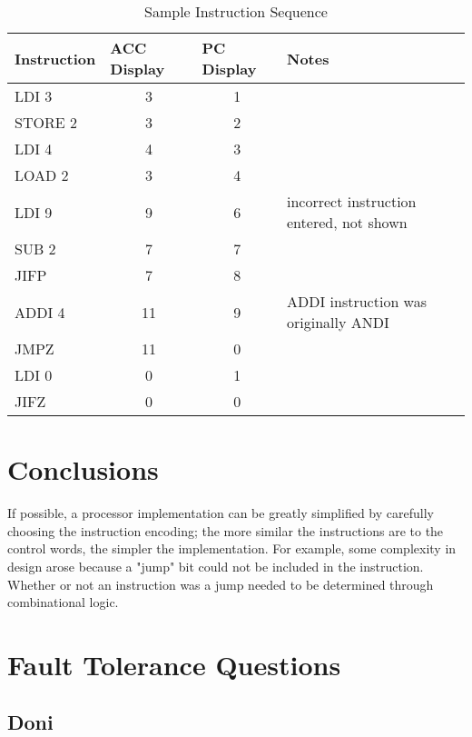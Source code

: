 \documentclass{scrreprt}
\newcommand{\TabLabel}[1]{\label{tab:#1}}
\begin{document}
    \begin{table}[ht]
        \centering
        \begin{tabular}{|l|c|c|l|} \hline
            \bf Instruction & \multicolumn{1}{|l|}{\bf ACC Display} & \multicolumn{1}{|l|}{\bf PC Display} & \bf Notes  \\ \hline
            LDI 3   & 3  & 1 & \\ \hline
            STORE 2 & 3  & 2 & \\ \hline
            LDI 4   & 4  & 3 & \\ \hline
            LOAD 2  & 3  & 4 & \\ \hline
            LDI 9   & 9  & 6 & incorrect instruction entered, not shown\\ \hline
            SUB 2   & 7  & 7 & \\ \hline
            JIFP    & 7  & 8 & \\ \hline
            ADDI 4  & 11 & 9 & ADDI instruction was originally ANDI\\ \hline
            JMPZ    & 11 & 0 & \\ \hline
            LDI 0   & 0  & 1 & \\ \hline
            JIFZ    & 0  & 0 & \\ \hline
        \end{tabular}
        \caption{Sample Instruction Sequence}
        \TabLabel{sample}
    \end{table}
    
\section{Conclusions}
    If possible, a processor implementation can be greatly simplified by carefully choosing the instruction encoding; the more similar the instructions are to the control words, the simpler the implementation. For example, some complexity in design arose because a "jump" bit could not be included in the instruction. Whether or not an instruction was a jump needed to be determined through combinational logic.

\section{Fault Tolerance Questions}
    \subsection{Doni}
\end{document}
